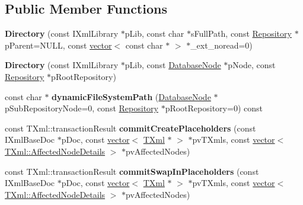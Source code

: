 \subsection*{\-Public \-Member \-Functions}
\begin{DoxyCompactItemize}
\item 
\hypertarget{classgeneral__server_1_1Directory_a360fb88f3edf9f4a2209202c5b7da80d}{{\bfseries \-Directory} (const \-I\-Xml\-Library $\ast$p\-Lib, const char $\ast$s\-Full\-Path, const \hyperlink{classgeneral__server_1_1Repository}{\-Repository} $\ast$p\-Parent=\-N\-U\-L\-L, const \hyperlink{classvector}{vector}$<$ const char $\ast$ $>$ $\ast$\-\_\-ext\-\_\-noread=0)}\label{classgeneral__server_1_1Directory_a360fb88f3edf9f4a2209202c5b7da80d}

\item 
\hypertarget{classgeneral__server_1_1Directory_aca3cb43ef1346cd7fdfaee751ec447f0}{{\bfseries \-Directory} (const \-I\-Xml\-Library $\ast$p\-Lib, const \hyperlink{classgeneral__server_1_1DatabaseNode}{\-Database\-Node} $\ast$p\-Node, const \hyperlink{classgeneral__server_1_1Repository}{\-Repository} $\ast$p\-Root\-Repository)}\label{classgeneral__server_1_1Directory_aca3cb43ef1346cd7fdfaee751ec447f0}

\item 
\hypertarget{classgeneral__server_1_1Directory_aa289355e8b0a7122fed0147c8e82120c}{const char $\ast$ {\bfseries dynamic\-File\-System\-Path} (\hyperlink{classgeneral__server_1_1DatabaseNode}{\-Database\-Node} $\ast$p\-Sub\-Repository\-Node=0, const \hyperlink{classgeneral__server_1_1Repository}{\-Repository} $\ast$p\-Root\-Repository=0) const }\label{classgeneral__server_1_1Directory_aa289355e8b0a7122fed0147c8e82120c}

\item 
\hypertarget{classgeneral__server_1_1Directory_a056c84f0986daeab69f3bb4c12bc4121}{const \-T\-Xml\-::transaction\-Result {\bfseries commit\-Create\-Placeholders} (const \-I\-Xml\-Base\-Doc $\ast$p\-Doc, const \hyperlink{classvector}{vector}$<$ \hyperlink{classgeneral__server_1_1TXml}{\-T\-Xml} $\ast$ $>$ $\ast$pv\-T\-Xmls, const \hyperlink{classvector}{vector}$<$ \hyperlink{structgeneral__server_1_1TXml_1_1AffectedNodeDetails}{\-T\-Xml\-::\-Affected\-Node\-Details} $>$ $\ast$pv\-Affected\-Nodes)}\label{classgeneral__server_1_1Directory_a056c84f0986daeab69f3bb4c12bc4121}

\item 
\hypertarget{classgeneral__server_1_1Directory_aa413a6b0e87b139bff7433e129b09cad}{const \-T\-Xml\-::transaction\-Result {\bfseries commit\-Swap\-In\-Placeholders} (const \-I\-Xml\-Base\-Doc $\ast$p\-Doc, const \hyperlink{classvector}{vector}$<$ \hyperlink{classgeneral__server_1_1TXml}{\-T\-Xml} $\ast$ $>$ $\ast$pv\-T\-Xmls, const \hyperlink{classvector}{vector}$<$ \hyperlink{structgeneral__server_1_1TXml_1_1AffectedNodeDetails}{\-T\-Xml\-::\-Affected\-Node\-Details} $>$ $\ast$pv\-Affected\-Nodes)}\label{classgeneral__server_1_1Directory_aa413a6b0e87b139bff7433e129b09cad}


\end{DoxyCompactItemize}
